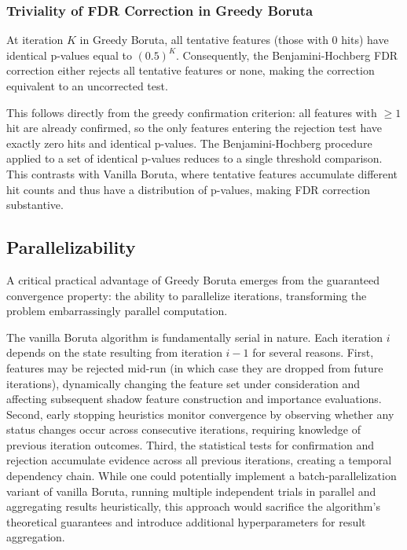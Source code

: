 \documentclass[runningheads]{llncs}
\begin{document}
\subsubsection{Triviality of FDR Correction in Greedy Boruta}

\begin{theorem}
\label{thm:fdr_trivial}
At iteration $K$ in Greedy Boruta, all tentative features (those with 0 hits) have identical p-values equal to $(0.5)^K$. Consequently, the Benjamini-Hochberg FDR correction either rejects all tentative features or none, making the correction equivalent to an uncorrected test.
\end{theorem}

This follows directly from the greedy confirmation criterion: all features with $\geq 1$ hit are already confirmed, so the only features entering the rejection test have exactly zero hits and identical p-values. The Benjamini-Hochberg procedure applied to a set of identical p-values reduces to a single threshold comparison. This contrasts with Vanilla Boruta, where tentative features accumulate different hit counts and thus have a distribution of p-values, making FDR correction substantive.

\subsection{Parallelizability}
\label{sec:method:parallel}

A critical practical advantage of Greedy Boruta emerges from the guaranteed convergence property: the ability to parallelize iterations, transforming the problem embarrassingly parallel computation.

The vanilla Boruta algorithm is fundamentally serial in nature. Each iteration $i$ depends on the state resulting from iteration $i-1$ for several reasons. First, features may be rejected mid-run (in which case they are dropped from future iterations), dynamically changing the feature set under consideration and affecting subsequent shadow feature construction and importance evaluations. Second, early stopping heuristics monitor convergence by observing whether any status changes occur across consecutive iterations, requiring knowledge of previous iteration outcomes. Third, the statistical tests for confirmation and rejection accumulate evidence across all previous iterations, creating a temporal dependency chain. While one could potentially implement a batch-parallelization variant of vanilla Boruta, running multiple independent trials in parallel and aggregating results heuristically, this approach would sacrifice the algorithm's theoretical guarantees and introduce additional hyperparameters for result aggregation.
\end{document}
